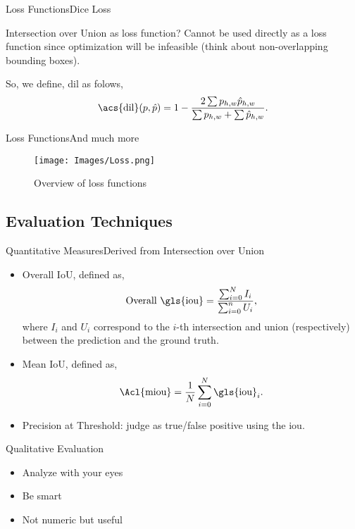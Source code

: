 \documentclass{beamer}
\begin{document}
\begin{frame}{Loss Functions}{Dice Loss}
  \begin{alertblock}{Intersection over Union as loss function?}
    Cannot be used directly as a loss function since optimization will be
    \alert{infeasible} (think about non-overlapping bounding boxes).
  \end{alertblock}
  So, we define, \acf{dil} as folows,
  \begin{equation}
    \text{\acs{dil}}(p, \hat{p}) = 1 -
    \frac{2\sum p_{h, w}\hat{p}_{h, w}}{\sum p_{h, w} + \sum \hat{p}_{h, w}}.
  \end{equation}
\end{frame}

\begin{frame}{Loss Functions}{And much more}
  \begin{figure}
    \texttt{[image: Images/Loss.png]}
    \caption{Overview of loss functions}
  \end{figure}
\end{frame}


\subsection{Evaluation Techniques}

\begin{frame}{Quantitative Measures}{Derived from Intersection over Union}
  \begin{itemize}
    \item Overall IoU, defined as,
    \begin{equation}
      \text{Overall \gls{iou}} =
      \frac{\sum_{i=0}^N I_i}{\sum_{i=0}^n U_i},
    \end{equation}
    where \(I_i\) and \(U_i\) correspond to the \(i\)-th intersection and union
    (respectively) between the prediction and the ground truth.
    \item Mean IoU, defined as,
    \begin{equation}
      \text{\Acl{miou}} = \frac{1}{N}\sum_{i=0}^N \text{\gls{iou}}_i.
    \end{equation}
    \item Precision at Threshold: judge as true/false positive using the
    \gls{iou}.
  \end{itemize}
\end{frame}

\begin{frame}{Qualitative Evaluation}
  \begin{itemize}
    \item Analyze with your eyes
    \item Be smart
    \item Not numeric but useful
  \end{itemize}
\end{frame}
\end{document}
